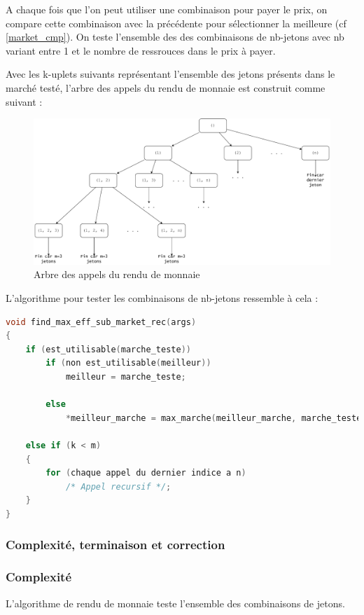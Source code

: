 A chaque fois que l'on peut utiliser une combinaison pour payer le prix, on compare cette combinaison avec la précédente pour sélectionner la meilleure (cf \ref{market_cmp}). On teste l'ensemble des des combinaisons de nb-jetons avec nb variant entre 1 et le nombre de ressrouces dans le prix à payer.

Avec les k-uplets suivants représentant l'ensemble des jetons présents dans le marché testé, l'arbre des appels du rendu de monnaie est construit comme suivant :

\begin{figure}[H]
    \centering
    \includegraphics[width=\textwidth]{img/call_tree.pdf}
    \caption{Arbre des appels du rendu de monnaie}
    \label{fig:enter-label}
\end{figure}

L'algorithme pour tester les combinaisons de nb-jetons ressemble à cela :

\begin{lstlisting}[language=C, frame=single, caption={Algorithme de test des combinaison de nb-jetons}]
void find_max_eff_sub_market_rec(args)
{
    if (est_utilisable(marche_teste))
        if (non est_utilisable(meilleur))
            meilleur = marche_teste;
            
        else
            *meilleur_marche = max_marche(meilleur_marche, marche_teste);

    else if (k < m)
    {
        for (chaque appel du dernier indice a n)
            /* Appel recursif */;
    }
}
\end{lstlisting}

\subsubsection*{Complexité, terminaison et correction}
\subsubsection*{Complexité}
L'algorithme de rendu de monnaie teste l'ensemble des combinaisons de jetons. 


